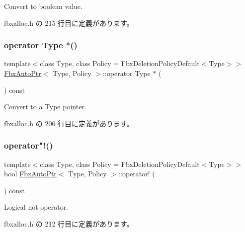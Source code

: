Convert to boolean value. 



 fbxalloc.\+h の 215 行目に定義があります。

\mbox{\label{class_fbx_auto_ptr_ab7d5ac9eadc5c51ea062016f08640be1}} 
\subsubsection{\texorpdfstring{operator Type $\ast$()}{operator Type *()}}
{\footnotesize\ttfamily template$<$class Type, class Policy = Fbx\+Deletion\+Policy\+Default$<$\+Type$>$$>$ \\
\hyperlink{class_fbx_auto_ptr}{Fbx\+Auto\+Ptr}$<$ Type, Policy $>$\+::operator Type $\ast$ (\begin{DoxyParamCaption}{ }\end{DoxyParamCaption}) const\hspace{0.3cm}{\ttfamily [inline]}}



Convert to a Type pointer. 



 fbxalloc.\+h の 206 行目に定義があります。

\mbox{\label{class_fbx_auto_ptr_afc9bb02ba900f9920772416291690f45}} 
\subsubsection{\texorpdfstring{operator"!()}{operator!()}}
{\footnotesize\ttfamily template$<$class Type, class Policy = Fbx\+Deletion\+Policy\+Default$<$\+Type$>$$>$ \\
bool \hyperlink{class_fbx_auto_ptr}{Fbx\+Auto\+Ptr}$<$ Type, Policy $>$\+::operator! (\begin{DoxyParamCaption}{ }\end{DoxyParamCaption}) const\hspace{0.3cm}{\ttfamily [inline]}}



Logical not operator. 



 fbxalloc.\+h の 212 行目に定義があります。


